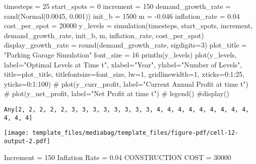 \documentclass[
  11pt,
]{article}
\newenvironment{Shaded}{\begin{snugshade}}{\end{snugshade}}
\newcommand{\CommentTok}[1]{\textcolor[rgb]{0.37,0.37,0.37}{#1}}
\newcommand{\FloatTok}[1]{\textcolor[rgb]{0.68,0.00,0.00}{#1}}
\newcommand{\FunctionTok}[1]{\textcolor[rgb]{0.28,0.35,0.67}{#1}}
\newcommand{\NormalTok}[1]{\textcolor[rgb]{0.00,0.23,0.31}{#1}}
\newcommand{\OperatorTok}[1]{\textcolor[rgb]{0.37,0.37,0.37}{#1}}
\newcommand{\StringTok}[1]{\textcolor[rgb]{0.13,0.47,0.30}{#1}}
\begin{document}
\begin{Shaded}
\begin{Highlighting}[numbers=left,,]
\NormalTok{timesteps }\OperatorTok{=} \FloatTok{25} 
\NormalTok{start\_spots }\OperatorTok{=} \FloatTok{0}
\NormalTok{increment }\OperatorTok{=} \FloatTok{150}
\NormalTok{demand\_growth\_rate }\OperatorTok{=} \FunctionTok{rand}\NormalTok{(}\FunctionTok{Normal}\NormalTok{(}\FloatTok{0.0045}\NormalTok{, }\FloatTok{0.001}\NormalTok{))}
\NormalTok{init\_b }\OperatorTok{=} \FloatTok{1500}
\NormalTok{m }\OperatorTok{=} \OperatorTok{{-}}\FloatTok{0.046}
\NormalTok{inflation\_rate }\OperatorTok{=} \FloatTok{0.04}
\NormalTok{cost\_per\_spot }\OperatorTok{=} \FloatTok{20000}
\NormalTok{y\_levels }\OperatorTok{=} \FunctionTok{simulation}\NormalTok{(timesteps, start\_spots, increment, demand\_growth\_rate, init\_b, m, inflation\_rate, cost\_per\_spot)}
\NormalTok{display\_growth\_rate }\OperatorTok{=} \FunctionTok{round}\NormalTok{(demand\_growth\_rate, sigdigits}\OperatorTok{=}\FloatTok{3}\NormalTok{)}
\NormalTok{plot\_title }\OperatorTok{=} \StringTok{"Parking Garage Simulation"}
\NormalTok{font\_size }\OperatorTok{=} \FloatTok{16}
\FunctionTok{println}\NormalTok{(y\_levels)}
\FunctionTok{plot}\NormalTok{(y\_levels, label}\OperatorTok{=}\StringTok{"Optimal Levels at Time t"}\NormalTok{, xlabel}\OperatorTok{=}\StringTok{"Year"}\NormalTok{, ylabel}\OperatorTok{=}\StringTok{"Number of Levels"}\NormalTok{,}
\NormalTok{title}\OperatorTok{=}\NormalTok{plot\_title, titlefontsize}\OperatorTok{=}\NormalTok{font\_size, lw}\OperatorTok{=}\FloatTok{1}\NormalTok{, gridlinewidth}\OperatorTok{=}\FloatTok{1}\NormalTok{, xticks}\OperatorTok{=}\FloatTok{0}\OperatorTok{:}\FloatTok{1}\OperatorTok{:}\FloatTok{25}\NormalTok{, yticks}\OperatorTok{=}\FloatTok{0}\OperatorTok{:}\FloatTok{1}\OperatorTok{:}\FloatTok{100}\NormalTok{)}
\CommentTok{\# plot(y\_curr\_profit, label="Current Annual Profit at time t")}
\CommentTok{\# plot(y\_net\_profit, label="Net Profit at time t")}
\CommentTok{\# legend()}
\CommentTok{\#display()}
\end{Highlighting}
\end{Shaded}

\begin{verbatim}
Any[2, 2, 2, 2, 2, 3, 3, 3, 3, 3, 3, 3, 3, 4, 4, 4, 4, 4, 4, 4, 4, 4, 4, 4, 4]
\end{verbatim}

\texttt{[image: template\_files/mediabag/template\_files/figure-pdf/cell-12-output-2.pdf]}

Increment = 150 Inflation Rate = 0.04 CONSTRUCTION COST = 30000
\end{document}
